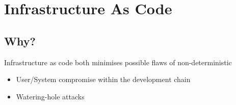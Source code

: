 \documentclass{beamer}
\begin{document}
\section{Infrastructure As Code}
\subsection{Why?}

\begin{frame}
    Infrastructure as code both minimises possible flaws of non-deterministic

    \begin{itemize}
        \item User/System compromise within the development chain
        \item Watering-hole attacks
    \end{itemize}
\end{frame}
\end{document}
